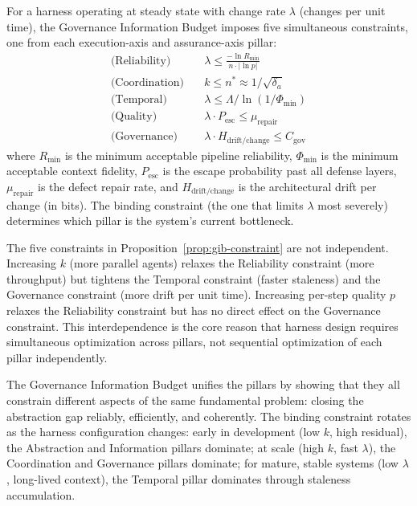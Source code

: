 \begin{proposition}
\label{prop:gib-constraint}
For a harness operating at steady state with change rate $\lambda$ (changes per unit time), the Governance Information Budget imposes five simultaneous constraints, one from each execution-axis and assurance-axis pillar:
\begin{align}
    \text{(Reliability)} &\quad \lambda \leq \frac{-\ln R_{\min}}{n \cdot |\ln p|} \label{eq:gib-rel} \\
    \text{(Coordination)} &\quad k \leq n^* \approx 1/\sqrt{\delta_a} \label{eq:gib-coord} \\
    \text{(Temporal)} &\quad \lambda \leq \Lambda / \ln(1/\Phi_{\min}) \label{eq:gib-temp} \\
    \text{(Quality)} &\quad \lambda \cdot P_{\text{esc}} \leq \mu_{\text{repair}} \label{eq:gib-qual} \\
    \text{(Governance)} &\quad \lambda \cdot H_{\text{drift/change}} \leq C_{\text{gov}} \label{eq:gib-gov}
\end{align}
where $R_{\min}$ is the minimum acceptable pipeline reliability, $\Phi_{\min}$ is the minimum acceptable context fidelity, $P_{\text{esc}}$ is the escape probability past all defense layers, $\mu_{\text{repair}}$ is the defect repair rate, and $H_{\text{drift/change}}$ is the architectural drift per change (in bits). The binding constraint (the one that limits $\lambda$ most severely) determines which pillar is the system's current bottleneck.
\end{proposition}

\begin{remark}
The five constraints in Proposition~\ref{prop:gib-constraint} are not independent. Increasing $k$ (more parallel agents) relaxes the Reliability constraint (more throughput) but tightens the Temporal constraint (faster staleness) and the Governance constraint (more drift per unit time). Increasing per-step quality $p$ relaxes the Reliability constraint but has no direct effect on the Governance constraint. This interdependence is the core reason that harness design requires simultaneous optimization across pillars, not sequential optimization of each pillar independently.
\end{remark}

The Governance Information Budget unifies the pillars by showing that they all constrain different aspects of the same fundamental problem: closing the abstraction gap reliably, efficiently, and coherently. The binding constraint rotates as the harness configuration changes: early in development (low $k$, high residual), the Abstraction and Information pillars dominate; at scale (high $k$, fast $\lambda$), the Coordination and Governance pillars dominate; for mature, stable systems (low $\lambda$, long-lived context), the Temporal pillar dominates through staleness accumulation.


